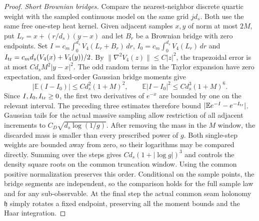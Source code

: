 \documentclass[11pt,a4paper]{article}
\numberwithin{equation}{section}
\newcommand{\hper}{\mathfrak h}
\begin{document}
\begin{proof}
\emph{Short Brownian bridges.}
Compare the nearest-neighbor discrete quartic weight with the sampled continuous model on the same grid \(j d_s\). Both use the same free one-step heat kernel. Given adjacent samples \(x,y\) of norm at most \(2M\), put \(L_r=x+(r/d_s)(y-x)\) and let \(B_r\) be a Brownian bridge with zero endpoints. Set \(I=c_m\int_0^{d_s}V_4(L_r+B_r)\,dr\), \(I_0=c_m\int_0^{d_s}V_4(L_r)\,dr\) and \(I_{\rm tr}=c_m d_s(V_4(x)+V_4(y))/2\). By \(\|\nabla^2V_4(z)\|\le C|z|^2\), the trapezoidal error is at most \(C d_s M^2|y-x|^2\). The odd random terms in the Taylor expansion have zero expectation, and fixed-order Gaussian bridge moments give
\[
 |\mathbb E(I-I_0)|\le C d_s^2(1+M)^2,\qquad
 \mathbb E|I-I_0|^2\le C d_s^3(1+M)^6 .
\]
Since \(I,I_0,I_{\rm tr}\ge0\), the first two derivatives of \(e^{-x}\) are bounded by one on the relevant interval. The preceding three estimates therefore bound \(\lvert \mathbb E e^{-I}-e^{-I_{\rm tr}}\rvert\). Gaussian tails for the actual massive sampling allow restriction of all adjacent increments to \(C_D\sqrt{d_s\log(1/g)}\). After removing the mass in the \(M\) window, the discarded mass is smaller than every prescribed power of \(g\). Both single-step weights are bounded away from zero, so their logarithms may be compared directly. Summing over the steps gives \(C d_s(1+|\log g|)^3\) and controls the density square roots on the common truncation window. Using the common positive normalization preserves this order. Conditional on the sample points, the bridge segments are independent, so the comparison holds for the full sample law and for any sub-observable. At the final step the actual common seam holonomy \(\hper\) simply rotates a fixed endpoint, preserving all the moment bounds and the Haar integration.


\end{proof}
\end{document}
